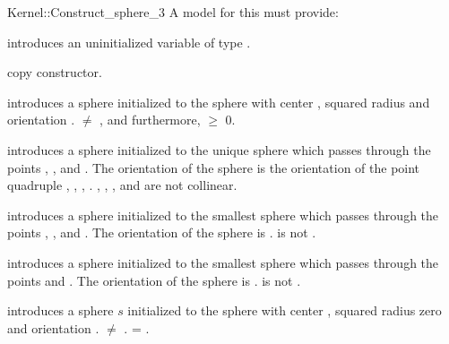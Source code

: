 \begin{ccRefFunctionObjectConcept}{Kernel::Construct_sphere_3}
A model for this must provide:


\ccHidden
{}
       {introduces an uninitialized variable of type \ccRefName.}

\ccHidden
{}
        {copy constructor.}

        {introduces a sphere initialized to the sphere with center ,
        squared radius  and orientation
        .
        \ccPrecond {} $\neq$ , and furthermore,
                    $\geq$ 0.}

	{introduces a sphere initialized to the unique sphere which passes
	through the points , ,  and . The
	orientation of the sphere is the orientation of the point quadruple
	, , , .
        \ccPrecond {}, , , and  are not collinear.}


      {introduces a sphere initialized to the smallest sphere which passes
      through the points , , and . The orientation of
        the sphere is . \ccPrecond {} is not
        .}

	{introduces a sphere initialized to the smallest sphere which passes
	through the points  and . The orientation of
        the sphere is . \ccPrecond {} is not
        .}


      {introduces a sphere $s$ initialized to the sphere with center 
        , squared radius zero and orientation .
        \ccPrecond {} $\neq$ .
        \ccPostcond {} = .}

\end{ccRefFunctionObjectConcept}
